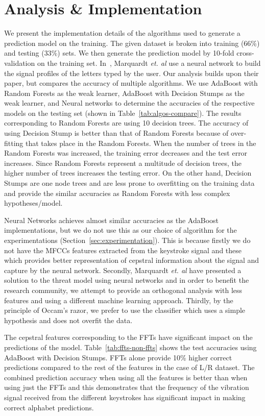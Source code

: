 \documentclass[11pt,conference]{IEEEtran}
\begin{document}
\section{Analysis \& Implementation}
\label{sec:implementation}
We present the implementation details of the algorithms used to generate a prediction model on the training. The given dataset is broken into training (66\%) and testing (33\%) sets. We then generate the prediction model by 10-fold cross-validation on the training set. In~\cite{spiphone}, Marquardt \emph{et. al} use a neural network to build the signal profiles of the letters typed by the user. Our analysis builds upon their paper, but compares the accuracy of multiple algorithms. We use AdaBoost with Random Forests as the weak learner, AdaBoost with Decision Stumps as the weak learner, and Neural networks to determine the accuracies of the respective models on the testing set (shown in Table~\ref{tab:algos-compare}). The results corresponding to Random Forests are using 10 decision trees. The accuracy of using Decision Stump is better than that of Random Forests because of over-fitting that takes place in the Random Forests. When the number of trees in the Random Forests was increased, the training error decreases and the test error increases. Since Random Forests represent a multitude of decision trees, the higher number of trees increases the testing error. On the other hand, Decision Stumps are one node trees and are less prone to overfitting on the training data and provide the similar accuracies as Random Forests with less complex hypotheses/model. 

Neural Networks achieves almost similar accuracies as the AdaBoost implementations, but we do not use this as our choice of algorithm for the experimentations (Section~\ref{sec:experimentation}). This is because firstly we do not have the MFCCs features extracted from the keystroke signal and these which provides better representation of cepstral information about the signal and capture by the neural network. Secondly, Marquardt \emph{et. al} have presented a solution to the threat model using neural networks and in order to benefit the research community, we attempt to provide an orthogonal analysis with less features and using a different machine learning approach. Thirdly, by the principle of Occam's razor, we prefer to use the classifier which uses a simple hypothesis and does not overfit the data.

The cepstral features corresponding to the FFTs have significant impact on the predictions of the model. Table~\ref{tab:ffts-non-ffts} shows the test accuracies using AdaBoost with Decision Stumps. FFTs alone provide 10\% higher correct predictions compared to the rest of the features in the case of L/R dataset. The combined prediction accuracy when using all the features is better than when using just the FFTs and this demonstrates that the frequency of the vibration signal received from the different keystrokes has significant impact in making correct alphabet predictions.
\end{document}
